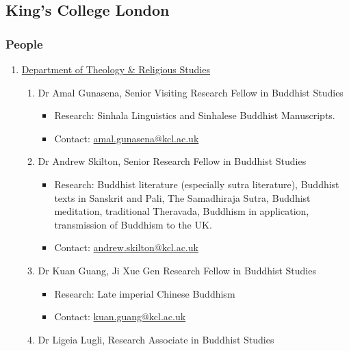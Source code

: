 \documentclass[a4paper,10.5pt]{article}
\begin{document}
\subsection{King's College London}
\label{sec:org213436a}
\subsubsection{People}
\label{sec:org5a454a7}
\begin{enumerate}
\item \href{https://www.kcl.ac.uk/trs}{Department of Theology \& Religious Studies}
\label{sec:orgdeb27ae}
\begin{enumerate}
\item Dr Amal Gunasena, Senior Visiting Research Fellow in Buddhist Studies
\label{sec:orgfc4df95}
\begin{itemize}
\item Research: Sinhala Linguistics and Sinhalese Buddhist Manuscripts.\\
\item Contact: \href{mailto:amal.gunasena@kcl.ac.uk}{amal.gunasena@kcl.ac.uk}\\
\end{itemize}
\item Dr Andrew Skilton, Senior Research Fellow in Buddhist Studies
\label{sec:org0ebdbfe}
\begin{itemize}
\item Research: Buddhist literature (especially sutra literature), Buddhist texts in Sanskrit and Pali, The Samadhiraja Sutra, Buddhist meditation, traditional Theravada, Buddhism in application, transmission of Buddhism to the UK.\\
\item Contact: \href{mailto:andrew.skilton@kcl.ac.uk}{andrew.skilton@kcl.ac.uk}\\
\end{itemize}
\item Dr Kuan Guang, Ji Xue Gen Research Fellow in Buddhist Studies
\label{sec:org638034a}
\begin{itemize}
\item Research: Late imperial Chinese Buddhism\\
\item Contact: \href{mailto:kuan.guang@kcl.ac.uk}{kuan.guang@kcl.ac.uk}\\
\end{itemize}
\item Dr Ligeia Lugli, Research Associate in Buddhist Studies
\label{sec:org3eec0e6}

\end{enumerate}
\end{enumerate}
\end{document}
